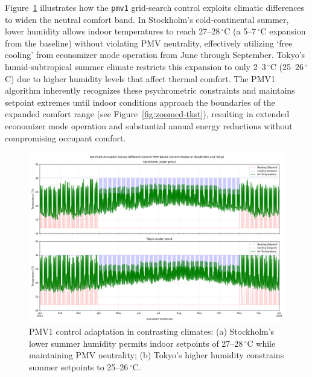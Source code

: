 Figure~\ref{fig:stockholm-tokyo} illustrates how the \texttt{pmv1} grid‐search control exploits climatic differences to widen the neutral comfort band. In Stockholm’s cold‐continental summer, lower humidity allows indoor temperatures to reach 27–28\,$^\circ$C (a 5–7\,$^\circ$C expansion from the baseline) without violating PMV neutrality, effectively utilizing `free cooling' from economizer mode operation from June through September. Tokyo's humid-subtropical summer climate restricts this expansion to only 2–3\,$^\circ$C (25–26\,$^\circ$C) due to higher humidity levels that affect thermal comfort. The PMV1 algorithm inherently recognizes these psychrometric constraints and maintains setpoint extremes until indoor conditions approach the boundaries of the expanded comfort range (see Figure~\ref{fig:zoomed-tkst}), resulting in extended economizer mode operation and substantial annual energy reductions without compromising occupant comfort.

\begin{figure}[h!]
    \centering
    \includegraphics[width=0.95\linewidth]{figs/Stockholm_Tokyo.png}
    \caption{PMV1 control adaptation in contrasting climates: (a) Stockholm’s lower summer humidity permits indoor setpoints of 27–28\,$^\circ$C while maintaining PMV neutrality; (b) Tokyo’s higher humidity constrains summer setpoints to 25–26\,$^\circ$C.}
    \label{fig:stockholm-tokyo}
\end{figure}

